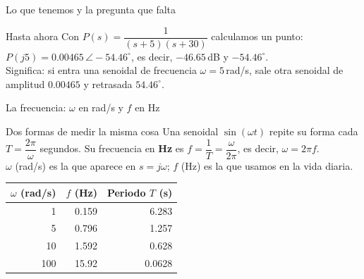 \documentclass[aspectratio=169,11pt]{beamer}
\newcommand{\ang}[1]{\angle #1^\circ}
\begin{document}
\begin{frame}{Lo que tenemos y la pregunta que falta}
  \small
  \setlength{\parskip}{3pt}
  \begin{block}{Hasta ahora}
    Con $P(s)=\dfrac{1}{(s+5)(s+30)}$ calculamos un punto: \quad $P(j5)=0.00465\,\ang{-54.46}$, es decir, $-46.65$\,dB y $-54.46^\circ$.\\
    Significa: si entra una senoidal de frecuencia $\omega=5$\,rad/s, sale otra senoidal de amplitud $0.00465$ y retrasada $54.46^\circ$.
  \end{block}


\end{frame}

\begin{frame}{La frecuencia: $\omega$ en rad/s y $f$ en Hz}
  \small
  \setlength{\parskip}{3pt}
  \begin{block}{Dos formas de medir la misma cosa}
    Una senoidal $\sin(\omega t)$ repite su forma cada $T=\dfrac{2\pi}{\omega}$ segundos. Su frecuencia en \textbf{Hz} es $f=\dfrac{1}{T}=\dfrac{\omega}{2\pi}$, es decir, $\omega=2\pi f$.\\
    $\omega$ (rad/s) es la que aparece en $s=j\omega$; $f$ (Hz) es la que usamos en la vida diaria.
  \end{block}

  \begin{center}
    \renewcommand{\arraystretch}{1.2}
    \begin{tabular}{rrr}
      \hline
      $\omega$ (rad/s) & $f$ (Hz) & Periodo $T$ (s) \\
      \hline
      1 & 0.159 & 6.283 \\
      5 & 0.796 & 1.257 \\
      10 & 1.592 & 0.628 \\
      100 & 15.92 & 0.0628 \\
      \hline
    \end{tabular}
  \end{center}

\end{frame}
\end{document}
